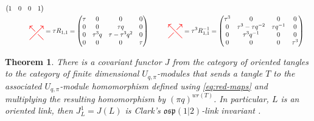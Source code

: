 \documentclass{amsart}
\newcommand{\hackcenter}[1]{
 \xy (0,0)*{#1}; \endxy}
\theoremstyle{plain}
\newtheorem{theorem}{Theorem}
\theoremstyle{definition}
\theoremstyle{definition}
\numberwithin{equation}{section}
\numberwithin{theorem}{section}
\def\mf{\mathfrak}
\numberwithin{equation}{section}
\begin{document}
\begin{align}
\begin{pmatrix}
    1 & 0 & 0 & 1
  \end{pmatrix} \\
\hackcenter{ \begin{tikzpicture} [scale=.75]
\draw[thick, red, ->] (0,0) to (1,1);
\draw[thick, red, -] (1,0) to (.6,.4);
\draw[thick, red, <-] (0,1) to (.4,.6);
\end{tikzpicture}} &= \tau R_{1,1} =
\begin{pmatrix}
\tau & 0 & 0 & 0 \\
0 & 0 & \tau q & 0 \\
0 & \tau^3q & \tau-\tau^3q^2 & 0 \\
0 & 0 & 0 & \tau
\end{pmatrix}
& \qquad
\hackcenter{ \begin{tikzpicture} [xscale=-1,scale=.75]
\draw[thick,   red, ->] (0,0) to (1,1);
\draw[thick,   red, -] (1,0) to (.6,.4);
\draw[thick,   red, <-] (0,1) to (.4,.6);
\end{tikzpicture}} &= \tau^3 R_{1,1}^{-1} =
\begin{pmatrix}
\tau^3 & 0 & 0 & 0 \\
0 & \tau^3-\tau q^{-2} & \tau q^{-1} & 0 \\
0 & \tau^3q^{-1} & 0 & 0 \\
0 & 0 & 0 & \tau^3
\end{pmatrix}
\end{align}

\begin{theorem}{\cite[Theorem 3.8, Corollary 3.9]{C}}
There is a covariant functor $J$ from the category of oriented tangles to the category of finite dimensional $U_{q,\pi}$-modules that sends a tangle $T$ to the associated $U_{q,\pi}$-module homomorphism defined using \ref{eq:red-maps} and multiplying the resulting homomorphism by $(\pi q)^{wr(T)}$.
In particular, $L$ is an oriented link, then $J_L^1=J(L)$ is Clark's $\mf{osp}(1|2)$-link invariant \cite[Example 3.10]{C}.
\end{theorem}
\end{document}
